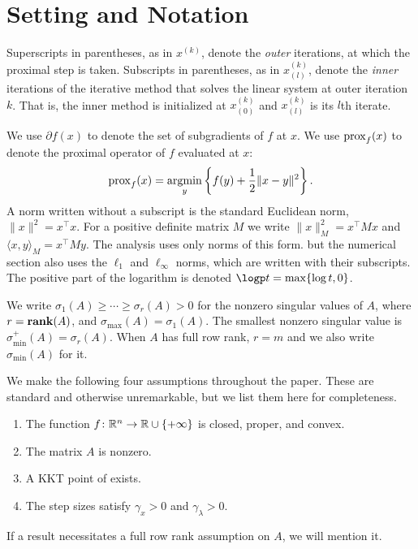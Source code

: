\documentclass[11pt]{article}
\begin{document}
\section{Setting and Notation}\label{sec:setting}
Superscripts in parentheses, as in $x^{(k)}$, denote the \emph{outer} iterations, at which the proximal step is taken.
Subscripts in parentheses, as in $x^{(k)}_{(l)}$, denote the \emph{inner} iterations of the iterative method that solves the linear system at outer iteration $k$.
That is, the inner method is initialized at $x^{(k)}_{(0)}$ and $x^{(k)}_{(l)}$ is its $l$th iterate.

We use $\partial f(x)$ to denote the set of subgradients of $f$ at $x$.
We use $\mathrm{prox}_{f}(x)$ to denote the proximal operator of $f$ evaluated at $x$:
\begin{equation*}
    \mathrm{prox}_{f}(x) = \mathop{\rm argmin}_{y} \left\{f(y) + \frac{1}{2}\|x-y\|^2\right\}.
\end{equation*}
A norm written without a subscript is the standard Euclidean norm, $\|x\|^2 = x^\top x$.
For a positive definite matrix $M$ we write $\|x\|_M^2 = x^\top M x$ and $\langle x, y\rangle_M = x^\top M y$.
The analysis uses only norms of this form. but the numerical section also uses the $\ell_1$ and $\ell_\infty$ norms, which are written with their subscripts.
The positive part of the logarithm is denoted $\logp t = \max\{\log t, 0\}$.

We write $\sigma_1(A) \geq \cdots \geq \sigma_r(A) > 0$ for the nonzero singular values of $A$, where $r = \mathop{\bf rank}(A)$, and $\sigma_{\max}(A) = \sigma_1(A)$.
The smallest nonzero singular value is $\sigma_{\min}^+(A) = \sigma_r(A)$.
When $A$ has full row rank, $r = m$ and we also write $\sigma_{\min}(A)$ for it.

\begin{assumption}\label{ass:standing}
    We make the following four assumptions throughout the paper.
    These are standard and otherwise unremarkable, but we list them here for completeness.
    \begin{enumerate}
        \item The function $f \colon \mathbb{R}^n \to \mathbb{R} \cup \{+\infty\}$ is closed, proper, and convex.
        \item The matrix $A$ is nonzero.
        \item A KKT point of  exists.
        \item The step sizes satisfy $\gamma_x > 0$ and $\gamma_\lambda > 0$.
    \end{enumerate}
    If a result necessitates a full row rank assumption on $A$, we will mention it.
\end{assumption}
\end{document}
